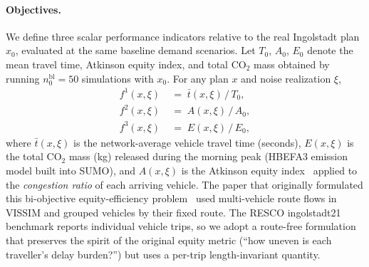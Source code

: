 \documentclass[12pt]{article}
\theoremstyle{plain}
\theoremstyle{definition}
\theoremstyle{remark}
\begin{document}
\paragraph{Objectives.}
We define three scalar performance indicators relative to the real
Ingolstadt plan $x_{0}$, evaluated at the same baseline demand
scenarios.  Let $T_{0}$, $A_{0}$, $E_{0}$ denote the mean travel time,
Atkinson equity index, and total CO$_{2}$ mass obtained by running
$n_{0}^{\text{bl}}=50$ simulations with $x_{0}$.  For any plan $x$ and
noise realization $\xi$,
\begin{align}
  f^{1}(x,\xi) &\;=\; \bar{t}(x,\xi)\,/\,T_{0}, \label{eq:f1_intas}\\
  f^{2}(x,\xi) &\;=\; A(x,\xi)\,/\,A_{0},        \label{eq:f2_intas}\\
  f^{3}(x,\xi) &\;=\; E(x,\xi)\,/\,E_{0},        \label{eq:f3_intas}
\end{align}
where $\bar{t}(x,\xi)$ is the network-average vehicle travel time
(seconds), $E(x,\xi)$ is the total CO$_{2}$ mass (kg) released during
the morning peak (HBEFA3 emission model built into SUMO), and
$A(x,\xi)$ is the Atkinson equity index~\citep{Atkinson1970}
applied to the \emph{congestion ratio} of each arriving vehicle.  The
paper that originally formulated this bi-objective equity-efficiency
problem~\citep{ZhengXueXuRan2019a} used multi-vehicle route flows in
VISSIM and grouped vehicles by their fixed route.  The RESCO
ingolstadt21 benchmark reports individual vehicle trips, so we adopt a
route-free formulation that preserves the spirit of the original equity
metric (``how uneven is each traveller's delay burden?'') but uses a
per-trip length-invariant quantity.
\end{document}
